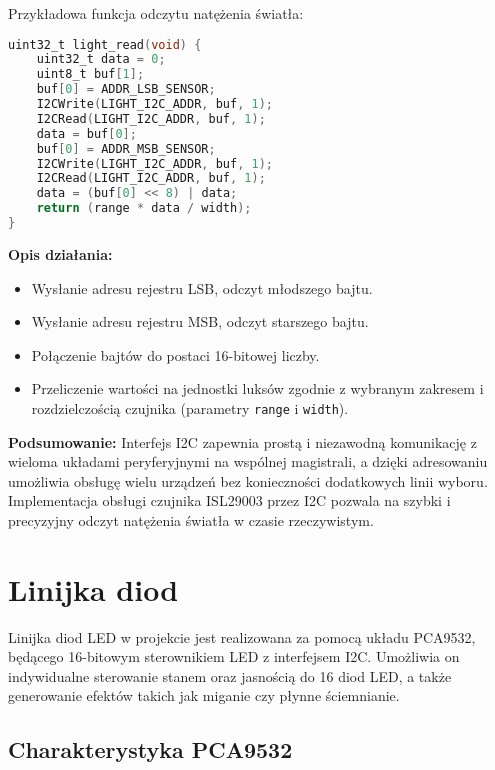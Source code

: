 \documentclass[letterpaper,11pt]{report}
\begin{document}
Przykładowa funkcja odczytu natężenia światła:
\begin{lstlisting}[language=C]
uint32_t light_read(void) {
    uint32_t data = 0;
    uint8_t buf[1];
    buf[0] = ADDR_LSB_SENSOR;
    I2CWrite(LIGHT_I2C_ADDR, buf, 1);
    I2CRead(LIGHT_I2C_ADDR, buf, 1);
    data = buf[0];
    buf[0] = ADDR_MSB_SENSOR;
    I2CWrite(LIGHT_I2C_ADDR, buf, 1);
    I2CRead(LIGHT_I2C_ADDR, buf, 1);
    data = (buf[0] << 8) | data;
    return (range * data / width);
}
\end{lstlisting}

\textbf{Opis działania:}
\begin{itemize}
    \item Wysłanie adresu rejestru LSB, odczyt młodszego bajtu.
    \item Wysłanie adresu rejestru MSB, odczyt starszego bajtu.
    \item Połączenie bajtów do postaci 16-bitowej liczby.
    \item Przeliczenie wartości na jednostki luksów zgodnie z wybranym zakresem i rozdzielczością czujnika (parametry \texttt{range} i \texttt{width}).
\end{itemize}

\textbf{Podsumowanie:}  
Interfejs I2C zapewnia prostą i niezawodną komunikację z wieloma układami peryferyjnymi na wspólnej magistrali, a dzięki adresowaniu umożliwia obsługę wielu urządzeń bez konieczności dodatkowych linii wyboru. Implementacja obsługi czujnika ISL29003 przez I2C pozwala na szybki i precyzyjny odczyt natężenia światła w czasie rzeczywistym.

\section{Linijka diod}

Linijka diod LED w projekcie jest realizowana za pomocą układu PCA9532, będącego 16-bitowym sterownikiem LED z interfejsem I2C. Umożliwia on indywidualne sterowanie stanem oraz jasnością do 16 diod LED, a także generowanie efektów takich jak miganie czy płynne ściemnianie.

\subsection{Charakterystyka PCA9532}
\end{document}
